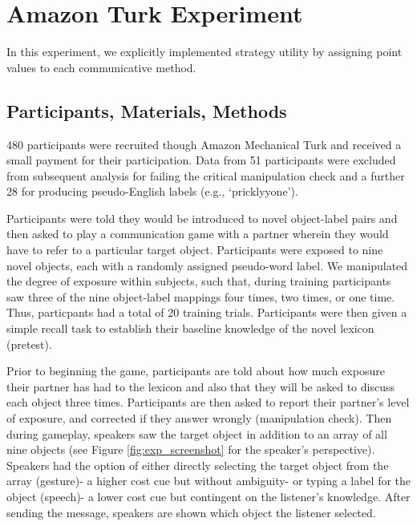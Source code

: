 \documentclass[10pt, letterpaper]{article}
\begin{document}
\section{Amazon Turk Experiment}\label{amazon-turk-experiment}

In this experiment, we explicitly implemented strategy utility by
assigning point values to each communicative method.

\subsection{Participants, Materials,
Methods}\label{participants-materials-methods-1}

480 participants were recruited though Amazon Mechanical Turk and
received a small payment for their participation. Data from 51
participants were excluded from subsequent analysis for failing the
critical manipulation check and a further 28 for producing
pseudo-English labels (e.g., `pricklyyone').

Participants were told they would be introduced to novel object-label
pairs and then asked to play a communication game with a partner wherein
they would have to refer to a particular target object. Participants
were exposed to nine novel objects, each with a randomly assigned
pseudo-word label. We manipulated the degree of exposure within
subjects, such that, during training participants saw three of the nine
object-label mappings four times, two times, or one time. Thus,
particpants had a total of 20 training trials. Participants were then
given a simple recall task to establish their baseline knowledge of the
novel lexicon (pretest).

Prior to beginning the game, participants are told about how much
exposure their partner has had to the lexicon and also that they will be
asked to discuss each object three times. Participants are then asked to
report their partner's level of exposure, and corrected if they answer
wrongly (manipulation check). Then during gameplay, speakers saw the
target object in addition to an array of all nine objects (see Figure
\ref{fig:exp_screenshot} for the speaker's perspective). Speakers had
the option of either directly selecting the target object from the array
(gesture)- a higher cost cue but without ambiguity- or typing a label
for the object (speech)- a lower cost cue but contingent on the
listener's knowledge. After sending the message, speakers are shown
which object the listener selected.
\end{document}
